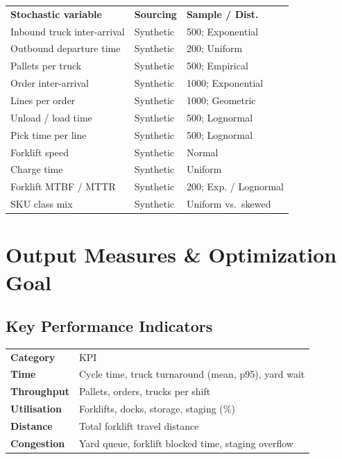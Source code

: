 \documentclass[10pt]{selfArx}
\begin{document}
{\small
\renewcommand{\arraystretch}{1.12}
\setlength{\tabcolsep}{3pt}
\noindent\begin{tabularx}{\columnwidth}{LP{1.35cm}P{2.6cm}}
 \textbf{Stochastic variable} & \textbf{Sourcing} & \textbf{Sample / Dist.} \\
Inbound truck inter-arrival & Synthetic & 500; Exponential \\
Outbound departure time     & Synthetic & 200; Uniform \\
Pallets per truck           & Synthetic & 500; Empirical \\
Order inter-arrival         & Synthetic & 1000; Exponential \\
Lines per order             & Synthetic & 1000; Geometric \\
Unload / load time          & Synthetic & 500; Lognormal \\
Pick time per line          & Synthetic & 500; Lognormal \\
Forklift speed              & Synthetic & Normal \\
Charge time                 & Synthetic & Uniform \\
Forklift MTBF / MTTR        & Synthetic & 200; Exp. / Lognormal \\
SKU class mix               & Synthetic & Uniform vs.\ skewed \\
\end{tabularx}}

\section{Output Measures \& Optimization Goal}

\subsection*{Key Performance Indicators}
{\small
\renewcommand{\arraystretch}{1.12}
\setlength{\tabcolsep}{3pt}
\noindent\begin{tabularx}{\columnwidth}{>{\bfseries}P{1.8cm}L}
 Category & KPI \\
Time        & Cycle time, truck turnaround (mean, p95), yard wait \\
Throughput  & Pallets, orders, trucks per shift \\
Utilisation & Forklifts, docks, storage, staging (\%) \\
Distance    & Total forklift travel distance \\
Congestion  & Yard queue, forklift blocked time, staging overflow \\
\end{tabularx}}
\end{document}
